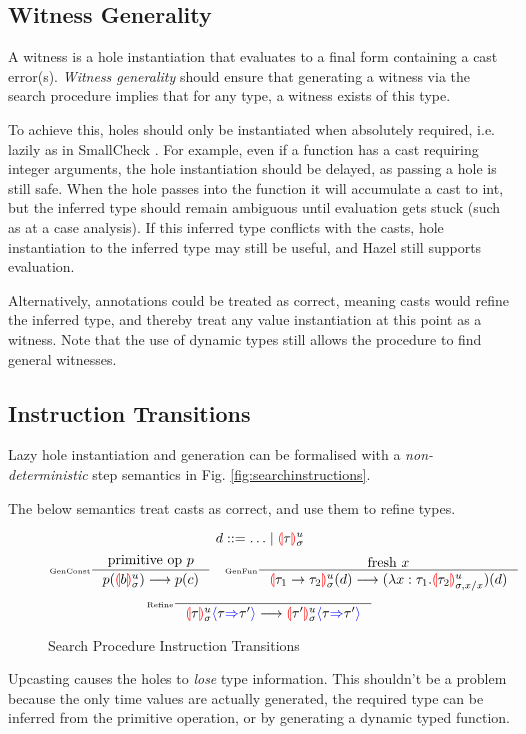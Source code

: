 \subsection{Witness Generality}
A witness is a hole instantiation that evaluates to a final form containing a cast error(s). \textit{Witness generality} should ensure that generating a witness via the search procedure implies that for any type, a witness exists of this type.\par 
To achieve this, holes should only be instantiated when absolutely required, i.e. lazily as in SmallCheck \cite{SmallCheck}. For example, even if a function has a cast requiring integer arguments, the hole instantiation should be delayed, as passing a hole is still safe. When the hole passes into the function it will accumulate a cast to int, but the inferred type should remain ambiguous until evaluation gets stuck (such as at a case analysis). If this inferred type conflicts with the casts, hole instantiation to the inferred type may still be useful, and Hazel still supports evaluation.\par 
Alternatively, annotations could be treated as correct, meaning casts would refine the inferred type, and thereby treat any value instantiation at this point as a witness. Note that the use of dynamic types still allows the procedure to find general witnesses.

\subsection{Instruction Transitions}
Lazy hole instantiation and generation can be formalised with a \textit{non-deterministic} step semantics in Fig. \ref{fig:searchinstructions}.\par 
The below semantics treat casts as correct, and use them to refine types.
\begin{figure}[h]
\[d ::= \dots \mid \hole[\tau]^u_\sigma\]
\tiny
\[
\inference[\tiny GenConst]{\text{primitive op $p$}}{p(\hole[b]^u_\sigma) \longrightarrow p(c)} \quad 
\inference[\tiny GenFun]{\text{fresh $x$}}{\hole[\tau_1 \to \tau_2]^u_\sigma(d) \longrightarrow (\lambda x:\tau_1. \hole[\tau_2]^u_{\sigma, x/x})(d)}
\]
\[
\inference[\tiny Refine]{}{\hole[\tau]^u_\sigma\scast{\tau}{\tau'} \longrightarrow \hole[\tau']^u_\sigma\scast{\tau}{\tau'}}
\]

\caption{Search Procedure Instruction Transitions}
\label{fig:searchevaluationorder}
\end{figure}

Upcasting causes the holes to \textit{lose} type information. This shouldn't be a problem because the only time values are actually generated, the required type can be inferred from the primitive operation, or by generating a dynamic typed function.

